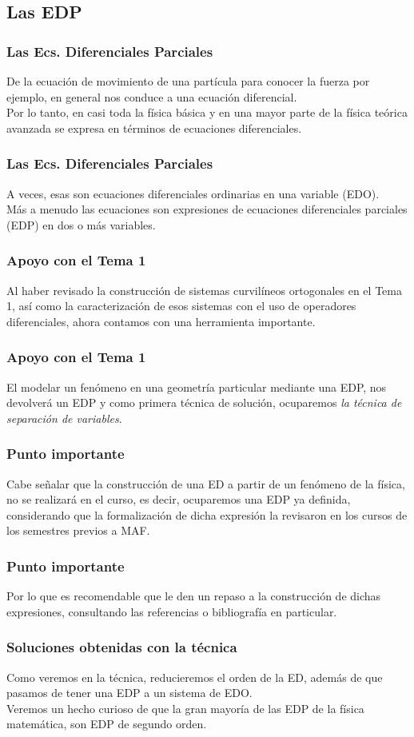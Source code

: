 \subsection{Las EDP}
\begin{frame}
\frametitle{Las Ecs. Diferenciales Parciales}
De la ecuación de movimiento de una partícula para conocer la fuerza por ejemplo, en general nos conduce a una ecuación diferencial.
\\
\bigskip
Por lo tanto, en casi toda la física  básica y en una mayor parte de la física teórica avanzada se expresa en términos de ecuaciones diferenciales.
\end{frame}
\begin{frame}
\frametitle{Las Ecs. Diferenciales Parciales}
A veces, esas son ecuaciones diferenciales ordinarias en una variable (EDO).
\\
\bigskip
Más a menudo las ecuaciones son expresiones de ecuaciones diferenciales parciales (EDP) en dos o más variables.
\end{frame}
\begin{frame}
\frametitle{Apoyo con el Tema 1}
Al haber revisado la construcción de sistemas curvilíneos ortogonales en el Tema 1, así como la caracterización de esos sistemas con el uso de operadores diferenciales, ahora contamos con una herramienta importante.
\end{frame}
\begin{frame}
\frametitle{Apoyo con el Tema 1}
El modelar un fenómeno en una geometría particular mediante una EDP, nos devolverá un EDP y como primera técnica de solución, ocuparemos \emph{la técnica de separación de variables}.
\end{frame}
\begin{frame}
\frametitle{Punto importante}
Cabe señalar que la construcción de una ED a partir de un fenómeno de la física, no se realizará en el curso, es decir, ocuparemos una EDP ya definida, considerando que la formalización de dicha expresión la revisaron en los cursos de los semestres previos a MAF.
\end{frame}
\begin{frame}
\frametitle{Punto importante}
Por lo que es recomendable que le den un repaso a la construcción de dichas expresiones, consultando las referencias o bibliografía en particular.
\end{frame}
\begin{frame}
\frametitle{Soluciones obtenidas con la técnica}
Como veremos en la técnica, reducieremos el orden de la ED, además de que pasamos de tener una EDP a un sistema de EDO.
\\
\bigskip
Veremos un hecho curioso de que la gran mayoría de las EDP de la física matemática, son EDP de segundo orden.
\end{frame}
